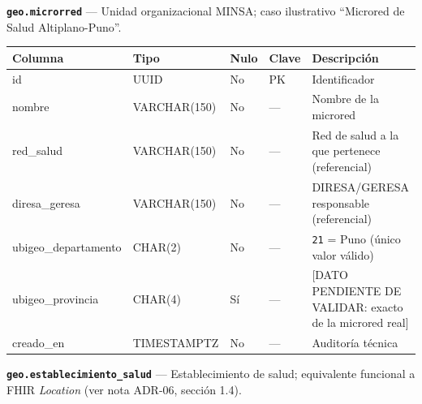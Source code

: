 \documentclass[11pt,a4paper]{article}
\begin{document}
\textbf{\texttt{geo.microrred}} --- Unidad organizacional MINSA; caso ilustrativo ``Microred de Salud Altiplano-Puno''.

{\small
\begin{longtable}[]{@{}
  >{\raggedright\arraybackslash}p{}
  >{\raggedright\arraybackslash}p{}
  >{\raggedright\arraybackslash}p{}
  >{\raggedright\arraybackslash}p{}
  >{\raggedright\arraybackslash}p{}@{}}
\toprule\noalign{}
\begin{minipage}[b]{\linewidth}\raggedright
Columna
\end{minipage} & \begin{minipage}[b]{\linewidth}\raggedright
Tipo
\end{minipage} & \begin{minipage}[b]{\linewidth}\raggedright
Nulo
\end{minipage} & \begin{minipage}[b]{\linewidth}\raggedright
Clave
\end{minipage} & \begin{minipage}[b]{\linewidth}\raggedright
Descripción
\end{minipage} \\
\midrule\noalign{}
\endhead
\bottomrule\noalign{}
\endlastfoot
id & UUID & No & PK & Identificador \\
nombre & VARCHAR(150) & No & --- & Nombre de la microred \\
red\_salud & VARCHAR(150) & No & --- & Red de salud a la que pertenece (referencial) \\
diresa\_geresa & VARCHAR(150) & No & --- & DIRESA/GERESA responsable (referencial) \\
ubigeo\_departamento & CHAR(2) & No & --- & \texttt{21} = Puno (único valor válido) \\
ubigeo\_provincia & CHAR(4) & Sí & --- & {[}DATO PENDIENTE DE VALIDAR: exacto de la microred real{]} \\
creado\_en & TIMESTAMPTZ & No & --- & Auditoría técnica \\
\end{longtable}
}

\textbf{\texttt{geo.establecimiento\_salud}} --- Establecimiento de salud; equivalente funcional a FHIR \emph{Location} (ver nota ADR-06, sección 1.4).
\end{document}

